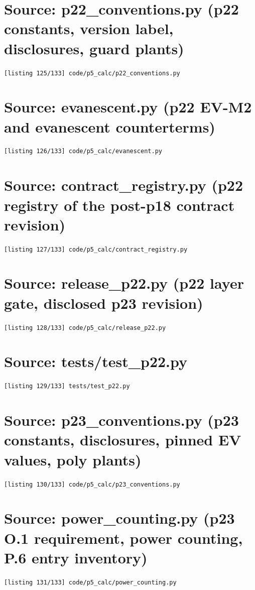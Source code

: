 \section{Source: p22\_conventions.py (p22 constants, version label, disclosures, guard plants)}
\noindent\texttt{[listing 125/133] code/p5\_calc/p22\_conventions.py}
{\scriptsize}

\section{Source: evanescent.py (p22 EV-M2 and evanescent counterterms)}
\noindent\texttt{[listing 126/133] code/p5\_calc/evanescent.py}
{\scriptsize}

\section{Source: contract\_registry.py (p22 registry of the post-p18 contract revision)}
\noindent\texttt{[listing 127/133] code/p5\_calc/contract\_registry.py}
{\scriptsize}

\section{Source: release\_p22.py (p22 layer gate, disclosed p23 revision)}
\noindent\texttt{[listing 128/133] code/p5\_calc/release\_p22.py}
{\scriptsize}

\section{Source: tests/test\_p22.py}
\noindent\texttt{[listing 129/133] tests/test\_p22.py}
{\scriptsize}

\section{Source: p23\_conventions.py (p23 constants, disclosures, pinned EV values, poly plants)}
\noindent\texttt{[listing 130/133] code/p5\_calc/p23\_conventions.py}
{\scriptsize}

\section{Source: power\_counting.py (p23 O.1 requirement, power counting, P.6 entry inventory)}
\noindent\texttt{[listing 131/133] code/p5\_calc/power\_counting.py}
{\scriptsize}


